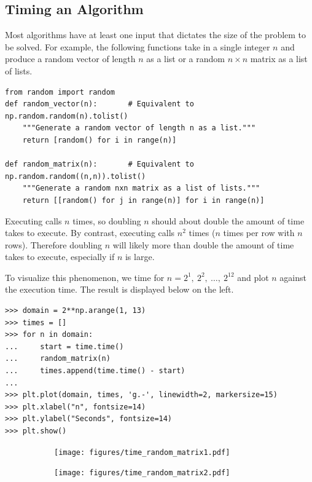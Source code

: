 \subsection*{Timing an Algorithm} %

Most algorithms have at least one input that dictates the size of the problem to be solved.
For example, the following functions take in a single integer $n$ and produce a random vector of length $n$ as a list or a random $n\times n$ matrix as a list of lists.

\begin{lstlisting}
from random import random
def random_vector(n):       # Equivalent to np.random.random(n).tolist()
    """Generate a random vector of length n as a list."""
    return [random() for i in range(n)]

def random_matrix(n):       # Equivalent to np.random.random((n,n)).tolist()
    """Generate a random nxn matrix as a list of lists."""
    return [[random() for j in range(n)] for i in range(n)]
\end{lstlisting}

Executing  calls  $n$ times, so doubling $n$ should about double the amount of time  takes to execute.
By contrast, executing  calls  $n^2$ times ($n$ times per row with $n$ rows).
Therefore doubling $n$ will likely more than double the amount of time  takes to execute, especially if $n$ is large.

To visualize this phenomenon, we time  for $n = 2^1,\ 2^2,\ \ldots,\ 2^{12}$ and plot $n$ against the execution time.
The result is displayed below on the left.

\begin{lstlisting}
>>> domain = 2**np.arange(1, 13)
>>> times = []
>>> for n in domain:
...     start = time.time()
...     random_matrix(n)
...     times.append(time.time() - start)
...
>>> plt.plot(domain, times, 'g.-', linewidth=2, markersize=15)
>>> plt.xlabel("n", fontsize=14)
>>> plt.ylabel("Seconds", fontsize=14)
>>> plt.show()
\end{lstlisting}

\begin{figure}[H] %
\captionsetup[subfigure]{justification=centering}
\centering
\begin{subfigure}{.5\textwidth}
    \centering
    \texttt{[image: figures/time\_random\_matrix1.pdf]}
\end{subfigure}%
\begin{subfigure}{.5\textwidth}
    \centering
    \texttt{[image: figures/time\_random\_matrix2.pdf]}
\end{subfigure}
\end{figure}


